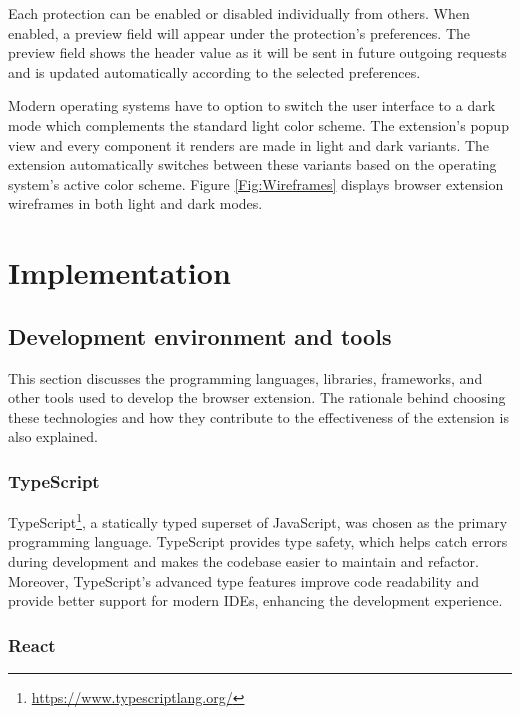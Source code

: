Each protection can be enabled or disabled individually from others. When enabled, a preview field will appear under the protection's preferences. The preview field shows the header value as it will be sent in future outgoing requests and is updated automatically according to the selected preferences.

Modern operating systems have to option to switch the user interface to a dark mode which complements the standard light color scheme. The extension's popup view and every component it renders are made in light and dark variants. The extension automatically switches between these variants based on the operating system's active color scheme. Figure \ref{Fig:Wireframes} displays browser extension wireframes in both light and dark modes.


\chapter{Implementation}


\section{Development environment and tools}

This section discusses the programming languages, libraries, frameworks, and other tools used to develop the browser extension. The rationale behind choosing these technologies and how they contribute to the effectiveness of the extension is also explained.

\subsection{TypeScript}

TypeScript\footnote{\url{https://www.typescriptlang.org/}}, a statically typed superset of JavaScript, was chosen as the primary programming language. TypeScript provides type safety, which helps catch errors during development and makes the codebase easier to maintain and refactor. Moreover, TypeScript's advanced type features improve code readability and provide better support for modern IDEs, enhancing the development experience.

\subsection{React}


